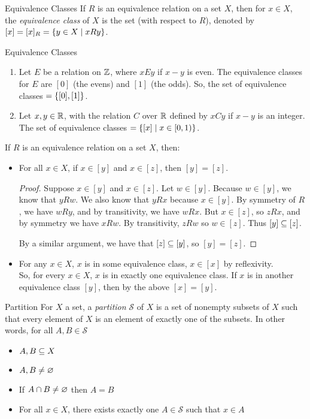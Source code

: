 \documentclass[class=article, crop=false]{standalone}
\begin{document}
  \begin{definition}{Equivalence Classes}
    If $R$ is an equivalence relation on a set $X$, then for $x\in X$, the \emph{equivalence class} of $X$ is the set (with respect to $R$), denoted by $[x] = [x]_R = \left\{y\in X\mid xRy\right\}$.
  \end{definition}
  \begin{example}{Equivalence Classes}
    \begin{enumerate}[label=(\alph*)]
      \item Let $E$ be a relation on $\mathbb{Z}$, where $xEy$ if $x-y$ is even. The equivalence classes for $E$ are $[0]$ (the evens) and $[1]$ (the odds). So, the set of equivalence classes $= \left\{[0], [1]\right\}$.
      \item Let $x, y\in\mathbb{R}$, with the relation $C$ over $\mathbb{R}$ defined by $xCy$ if $x - y$ is an integer. The set of equivalence classes $= \left\{[x]\mid x\in[0, 1)\right\}$.
    \end{enumerate}
  \end{example}
  If $R$ is an equivalence relation on a set $X$, then:
  \begin{itemize}
    \item For all $x\in X$, if $x\in [y]$ and $x\in [z]$, then $[y] = [z]$.
    \begin{proof}
      Suppose $x\in [y]$ and $x\in [z]$. Let $w\in [y]$. Because $w\in [y]$, we know that $yRw$. We also know that $yRx$ because $x\in[y]$. By symmetry of $R$, we have $wRy$, and by transitivity, we have $wRx$. But $x\in [z]$, so $zRx$, and by symmetry we have $xRw$. By transitivity, $zRw$ so $w\in [z]$. Thus $[y]\subseteq[z]$. \par
      By a similar argument, we have that $[z]\subseteq[y]$, so $[y]=[z]$.
    \end{proof}
    \item For any $x\in X$, $x$ is in some equivalence class, $x\in [x]$ by reflexivity. \\
    So, for every $x\in X$, $x$ is in exactly one equivalence class. If $x$ is in another equivalence class $[y]$, then by the above $[x] = [y]$.
  \end{itemize}
  \begin{definition}{Partition}
    For $X$ a set, a \emph{partition} $\mathcal{S}$ of $X$ is a set of nonempty subsets of $X$ such that every element of $X$ is an element of exactly one of the subsets. In other words, for all $A, B\in \mathcal{S}$
    \begin{itemize}
      \item $A, B\subseteq X$
      \item $A, B\neq\varnothing$
      \item If $A\cap B \neq\varnothing$ then $A = B$
      \item For all $x\in X$, there exists exactly one $A\in \mathcal{S}$ such that $x\in A$
    \end{itemize}
  \end{definition}
\end{document}

